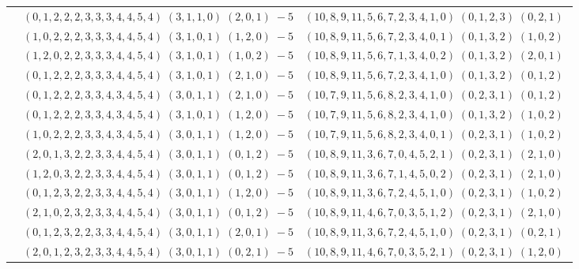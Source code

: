 \documentclass[11pt]{article}
\begin{document}
\begin{longtable}[l]{|c|c|c|}
 \cline{2-3} 
 & $(0 ,1 ,2 ,2 ,2 ,3 ,3 ,3 ,4 ,4 ,5 ,4) \;(3 ,1 ,1 ,0) \;(2 ,0 ,1) \;-5$ & $(10 ,8 ,9 ,11 ,5 ,6 ,7 ,2 ,3 ,4 ,1 ,0) \;(0 ,1 ,2 ,3) \;(0 ,2 ,1) \;$\\ 
 \cline{2-3} 
 & $(1 ,0 ,2 ,2 ,2 ,3 ,3 ,3 ,4 ,4 ,5 ,4) \;(3 ,1 ,0 ,1) \;(1 ,2 ,0) \;-5$ & $(10 ,8 ,9 ,11 ,5 ,6 ,7 ,2 ,3 ,4 ,0 ,1) \;(0 ,1 ,3 ,2) \;(1 ,0 ,2) \;$\\ 
 \cline{2-3} 
 & $(1 ,2 ,0 ,2 ,2 ,3 ,3 ,3 ,4 ,4 ,5 ,4) \;(3 ,1 ,0 ,1) \;(1 ,0 ,2) \;-5$ & $(10 ,8 ,9 ,11 ,5 ,6 ,7 ,1 ,3 ,4 ,0 ,2) \;(0 ,1 ,3 ,2) \;(2 ,0 ,1) \;$\\ 
 \cline{2-3} 
 & $(0 ,1 ,2 ,2 ,2 ,3 ,3 ,3 ,4 ,4 ,5 ,4) \;(3 ,1 ,0 ,1) \;(2 ,1 ,0) \;-5$ & $(10 ,8 ,9 ,11 ,5 ,6 ,7 ,2 ,3 ,4 ,1 ,0) \;(0 ,1 ,3 ,2) \;(0 ,1 ,2) \;$\\ 
 \cline{2-3} 
 & $(0 ,1 ,2 ,2 ,2 ,3 ,3 ,4 ,3 ,4 ,5 ,4) \;(3 ,0 ,1 ,1) \;(2 ,1 ,0) \;-5$ & $(10 ,7 ,9 ,11 ,5 ,6 ,8 ,2 ,3 ,4 ,1 ,0) \;(0 ,2 ,3 ,1) \;(0 ,1 ,2) \;$\\ 
 \cline{2-3} 
 & $(0 ,1 ,2 ,2 ,2 ,3 ,3 ,4 ,3 ,4 ,5 ,4) \;(3 ,1 ,0 ,1) \;(1 ,2 ,0) \;-5$ & $(10 ,7 ,9 ,11 ,5 ,6 ,8 ,2 ,3 ,4 ,1 ,0) \;(0 ,1 ,3 ,2) \;(1 ,0 ,2) \;$\\ 
 \cline{2-3} 
 & $(1 ,0 ,2 ,2 ,2 ,3 ,3 ,4 ,3 ,4 ,5 ,4) \;(3 ,0 ,1 ,1) \;(1 ,2 ,0) \;-5$ & $(10 ,7 ,9 ,11 ,5 ,6 ,8 ,2 ,3 ,4 ,0 ,1) \;(0 ,2 ,3 ,1) \;(1 ,0 ,2) \;$\\ 
 \cline{2-3} 
 & $(2 ,0 ,1 ,3 ,2 ,2 ,3 ,3 ,4 ,4 ,5 ,4) \;(3 ,0 ,1 ,1) \;(0 ,1 ,2) \;-5$ & $(10 ,8 ,9 ,11 ,3 ,6 ,7 ,0 ,4 ,5 ,2 ,1) \;(0 ,2 ,3 ,1) \;(2 ,1 ,0) \;$\\ 
 \cline{2-3} 
 & $(1 ,2 ,0 ,3 ,2 ,2 ,3 ,3 ,4 ,4 ,5 ,4) \;(3 ,0 ,1 ,1) \;(0 ,1 ,2) \;-5$ & $(10 ,8 ,9 ,11 ,3 ,6 ,7 ,1 ,4 ,5 ,0 ,2) \;(0 ,2 ,3 ,1) \;(2 ,1 ,0) \;$\\ 
 \cline{2-3} 
 & $(0 ,1 ,2 ,3 ,2 ,2 ,3 ,3 ,4 ,4 ,5 ,4) \;(3 ,0 ,1 ,1) \;(1 ,2 ,0) \;-5$ & $(10 ,8 ,9 ,11 ,3 ,6 ,7 ,2 ,4 ,5 ,1 ,0) \;(0 ,2 ,3 ,1) \;(1 ,0 ,2) \;$\\ 
 \cline{2-3} 
 & $(2 ,1 ,0 ,2 ,3 ,2 ,3 ,3 ,4 ,4 ,5 ,4) \;(3 ,0 ,1 ,1) \;(0 ,1 ,2) \;-5$ & $(10 ,8 ,9 ,11 ,4 ,6 ,7 ,0 ,3 ,5 ,1 ,2) \;(0 ,2 ,3 ,1) \;(2 ,1 ,0) \;$\\ 
 \cline{2-3} 
 & $(0 ,1 ,2 ,3 ,2 ,2 ,3 ,3 ,4 ,4 ,5 ,4) \;(3 ,0 ,1 ,1) \;(2 ,0 ,1) \;-5$ & $(10 ,8 ,9 ,11 ,3 ,6 ,7 ,2 ,4 ,5 ,1 ,0) \;(0 ,2 ,3 ,1) \;(0 ,2 ,1) \;$\\ 
 \cline{2-3} 
 & $(2 ,0 ,1 ,2 ,3 ,2 ,3 ,3 ,4 ,4 ,5 ,4) \;(3 ,0 ,1 ,1) \;(0 ,2 ,1) \;-5$ & $(10 ,8 ,9 ,11 ,4 ,6 ,7 ,0 ,3 ,5 ,2 ,1) \;(0 ,2 ,3 ,1) \;(1 ,2 ,0) \;$\\ 

\end{longtable}
\end{document}
